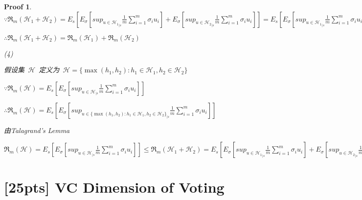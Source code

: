 \documentclass[a4paper,UTF8]{article}
\numberwithin{equation}{section}
\newtheorem*{myProof}{Proof}
\begin{document}
\begin{myProof}
    $\because \mathfrak{R}_m\left ( \mathcal{ H}_1+\mathcal{ H}_2 \right ) = E_s\left [ E_\sigma \left [ sup_{u\in {\mathcal{ H}_1}_{|s}}\frac{1}{m}\sum_{i=1}^{m} \sigma _iu_i\right ]+E_\sigma \left [ sup_{u\in {\mathcal{ H}_2}_{|s}}\frac{1}{m}\sum_{i=1}^{m} \sigma _iu_i\right ] \right ] = E_s\left [ E_\sigma \left [ sup_{u\in {\mathcal{ H}_1}_{|s}}\frac{1}{m}\sum_{i=1}^{m} \sigma _iu_i\right ]\right]+E_s\left [ E_\sigma \left [ sup_{u\in {\mathcal{ H}_2}_{|s}}\frac{1}{m}\sum_{i=1}^{m} \sigma _iu_i\right ]\right]$
    
    $\therefore \mathfrak{R}_m(\mathcal{H}_1 + \mathcal{H}_2) = \mathfrak{R}_m(\mathcal{H}_1) + \mathfrak{R}_m(\mathcal{H}_2)$
    
    (4)
    
    假设集~$\mathcal{H}$~定义为~$\mathcal{H} = \{\max(h_1,h_2): h_1\in \mathcal{H}_1, h_2\in \mathcal{H}_2\}$
    
    $\because \mathfrak{R}_m\left ( \mathcal{ H} \right ) = E_s\left [ E_\sigma \left [ sup_{u\in {\mathcal{ H}}_{|s}}\frac{1}{m}\sum_{i=1}^{m} \sigma _iu_i\right ] \right ]$
    
    $\therefore \mathfrak{R}_m\left ( \mathcal{ H} \right ) = E_s\left [ E_\sigma \left [ sup_{u\in { \{\max(h_1,h_2): h_1\in \mathcal{H}_1, h_2\in \mathcal{H}_2\}}_{|s}} \frac{1}{m}\sum_{i=1}^{m} \sigma _iu_i\right ] \right ]$
    
    由Talagrand's Lemma
    
    $\mathfrak{R}_m\left ( \mathcal{ H} \right ) = E_s\left [ E_\sigma \left [ sup_{u\in {\mathcal{ H}}_{|s}}\frac{1}{m}\sum_{i=1}^{m} \sigma _iu_i\right ] \right ]\leq \mathfrak{R}_m\left ( \mathcal{ H}_1+\mathcal{ H}_2 \right ) = E_s\left [ E_\sigma \left [ sup_{u\in {\mathcal{ H}_1}_{|s}}\frac{1}{m}\sum_{i=1}^{m} \sigma _iu_i\right ]+E_\sigma \left [ sup_{u\in {\mathcal{ H}_2}_{|s}}\frac{1}{m}\sum_{i=1}^{m} \sigma _iu_i\right ] \right ] = E_s\left [ E_\sigma \left [ sup_{u\in {\mathcal{ H}_1}_{|s}}\frac{1}{m}\sum_{i=1}^{m} \sigma _iu_i\right ]\right]+E_s\left [ E_\sigma \left [ sup_{u\in {\mathcal{ H}_2}_{|s}}\frac{1}{m}\sum_{i=1}^{m} \sigma _iu_i\right ]\right]$
    
    
    
    
    
\end{myProof}

\newpage 

\section{[25pts] VC Dimension of Voting}
\end{document}
